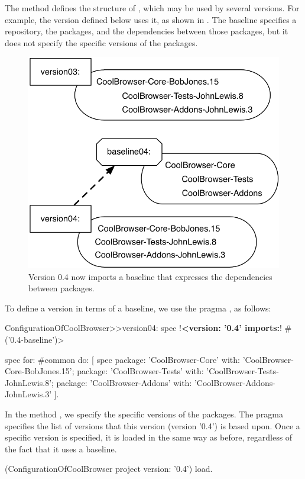 \documentclass[a4paper,10pt,twoside]{book}
\begin{document}
The method  defines the structure of ,
which may be used by several versions. For example, the version  defined below uses it, as shown in .  The baseline specifies a repository, the packages, and the  dependencies between those packages, but it does not specify the specific versions of the packages.

\begin{figure}
\begin{center}
\includegraphics[width=0.6\linewidth]{version04}
\caption{Version 0.4 now imports a baseline that expresses the dependencies between packages.\label{fig:version04}}
\end{center}
\end{figure}

To define a version in terms of a baseline, we use the pragma \mbox{}, as follows:

\begin{code}{}
ConfigurationOfCoolBrowser>>version04: spec
      !\textbf{<version: '0.4' imports:}! #('0.4-baseline')>

      spec for: #common do: [
             spec
                   package: 'CoolBrowser-Core' with: 'CoolBrowser-Core-BobJones.15';
                   package: 'CoolBrowser-Tests' with: 'CoolBrowser-Tests-JohnLewis.8';
                   package: 'CoolBrowser-Addons' with: 'CoolBrowser-Addons-JohnLewis.3' ].
\end{code}

In the method , we specify the specific versions of the packages. The pragma  specifies the list of versions that this version (version '0.4') is based upon. Once a specific version is specified, it is loaded in the same way as before, regardless of the fact that it uses a baseline.

\begin{code}{}
(ConfigurationOfCoolBrowser project version: '0.4') load.
\end{code}
\end{document}
